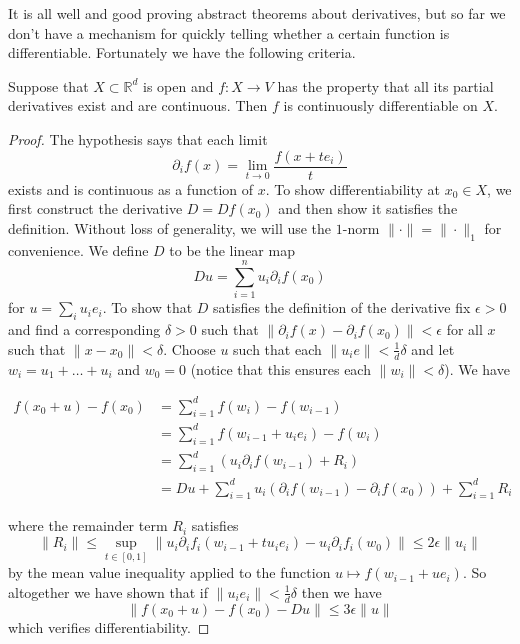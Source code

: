 \documentclass[twoside, a4paper, 10pt]{amsart}
\begin{document}
It is all well and good proving abstract theorems about derivatives, but so far we don't have a mechanism for quickly telling whether a certain function is differentiable. Fortunately we have the following criteria. 

\begin{prop} Suppose that $X \subset \mathbb{R}^d$ is open and $f:X \to V$ has the property that all its partial derivatives exist and are continuous. Then $f$ is continuously differentiable on $X$.

\end{prop}

\begin{proof} The hypothesis says that each limit $$\partial_if(x) = \lim_{t \to 0} \frac{f(x+te_i)}{t}$$ exists and is continuous as a function of $x$. To show differentiability at $x_0 \in X$, we first construct the derivative $D= Df (x_0) $ and then show it satisfies the definition. Without loss of generality, we will use the $1$-norm $\| \cdot \| = \| \cdot \|_1$ for convenience. We define $D$ to be the linear map $$Du = \sum_{i=1}^n u_i \partial_i f (x_0)$$ for $u = \sum_i u_i e_i$. To show that $D$ satisfies the definition of the derivative fix $\epsilon >0$ and find a corresponding $\delta >0$ such that $\| \partial_i f(x) - \partial_if (x_0) \| < \epsilon$ for all $x$ such that $\|x - x_0\| < \delta$. Choose $u$ such that each $\|u_ie\| < \frac{1}{d} \delta$ and let $w_i = u_1 + \ldots + u_i$ and $w_0 = 0$ (notice that this ensures each $\|w_i \| < \delta$). We have 

\begin{align*} f(x_0 + u) - f(x_0) &= \sum_{i=1}^d f(w_i) - f(w_{i-1}) \\ &= \sum_{i=1}^d f(w_{i-1} + u_i e_i) - f(w_{i}) \\ &= \sum_{i=1}^d (u_i \partial_i f(w_{i-1}) + R_i) \\ &= Du + \sum_{i=1}^d u_i \left(\partial_i f(w_{i-1}) - \partial_i f(x_0) \right) + \sum_{i=1}^d R_i \end{align*}

where the remainder term $R_i$ satisfies $$\|R_i \| \leq \sup_{t \in [0,1]} \| u_i \partial_i f_i (w_{i-1} + tu_ie_i) - u_i \partial_i f_i (w_0)\| \leq 2 \epsilon \|u_i\|$$ by the mean value inequality applied to the function $u \mapsto f(w_{i-1} + ue_i)$. So altogether we have shown that if $\|u_i e_i\| < \frac{1}{d}\delta$ then we have $$\|f(x_0 + u) -f(x_0) - Du\| \leq 3\epsilon \|u\|$$ which verifies differentiability. \end{proof}
\end{document}
